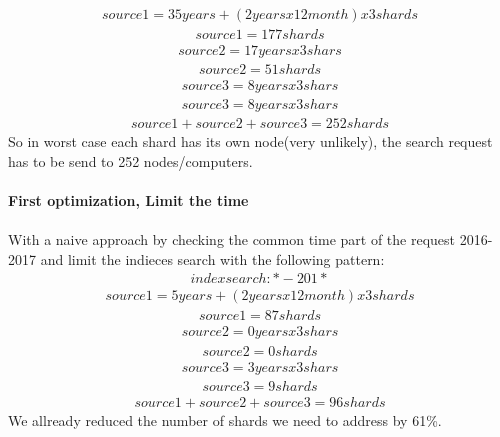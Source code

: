 \label{eq:jOliver}
\begin{align}
source1 = 35 years + (2years x 12 month) x 3 shards
\end{align}
\begin{align}
source1 = 177 shards
\end{align}
\begin{align}
source2 = 17 years x 3 shars
\end{align}
\begin{align}
source2 = 51 shards
\end{align}
\begin{align}
source3 = 8 years x 3 shars
\end{align}
\begin{align}
source3 = 8 years x 3 shars
\end{align}
\begin{align}
source1 + source2 + source3 = 252 shards
\end{align}
So in worst case each shard has its own node(very unlikely), the search request has to be send to 252 nodes/computers.\\
\\
\textbf{First optimization, Limit the time}\\
\\
With a naive approach by checking the common time part of the request 2016-2017 and limit the indieces search with the following pattern:
\begin{align}
indexsearch: *-201*
\end{align}
\begin{align}
source1 = 5 years + (2years x 12 month) x 3 shards
\end{align}
\begin{align}
source1 = 87 shards
\end{align}
\begin{align}
source2 = 0 years x 3 shars
\end{align}
\begin{align}
source2 = 0 shards
\end{align}
\begin{align}
source3 = 3 years x 3 shars
\end{align}
\begin{align}
source3 = 9 shards
\end{align}
\begin{align}
source1 + source2 + source3 = 96 shards
\end{align}
We allready reduced the number of shards we need to address by 61\%.\\
